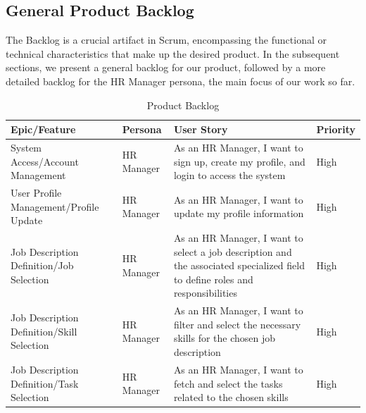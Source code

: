 \subsection{General Product Backlog}
The Backlog is a crucial artifact in Scrum, encompassing the functional or technical characteristics that make up the desired product. In the subsequent sections, we present a general backlog for our product, followed by a more detailed backlog for the HR Manager persona, the main focus of our work so far.


\begin{table}[H]
    \renewcommand{\arraystretch}{1.5}%
    \caption{Product Backlog}
    \centering
    \medskip
    \small
    \begin{tabularx}{\textwidth} {
            | >{\hsize=1\hsize\raggedright\arraybackslash}X
            | >{\hsize=0.5\hsize\raggedright\arraybackslash}X
            | >{\hsize=2\hsize\raggedright\arraybackslash}X
            | >{\hsize=0.5\hsize\raggedright\arraybackslash}X |}
        \hline
        \rowcolor{primary} \textbf {Epic/Feature}             & \textbf {Persona} & \textbf {User Story}                                                                                                           & \textbf {Priority} \\
        \hline
        System Access/Account Management                      & HR Manager        & As an HR Manager, I want to sign up, create my profile, and login to access the system                                         & High               \\
        \hline
        User Profile Management/Profile Update                & HR Manager        & As an HR Manager, I want to update my profile information                                                                      & High               \\
        \hline
        Job Description Definition/Job Selection              & HR Manager        & As an HR Manager, I want to select a job description and the associated specialized field to define roles and responsibilities & High               \\
        \hline
        Job Description Definition/Skill Selection            & HR Manager        & As an HR Manager, I want to filter and select the necessary skills for the chosen job description                              & High               \\
        \hline
        Job Description Definition/Task Selection             & HR Manager        & As an HR Manager, I want to fetch and select the tasks related to the chosen skills                                            & High               \\

\end{tabularx}
\end{table}
